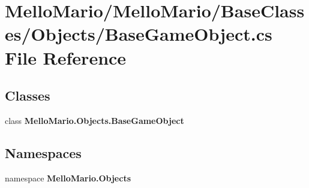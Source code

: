\section{Mello\+Mario/\+Mello\+Mario/\+Base\+Classes/\+Objects/\+Base\+Game\+Object.cs File Reference}
\label{BaseGameObject_8cs}
\subsection*{Classes}
\begin{DoxyCompactItemize}
\item 
class \textbf{ Mello\+Mario.\+Objects.\+Base\+Game\+Object}
\end{DoxyCompactItemize}
\subsection*{Namespaces}
\begin{DoxyCompactItemize}
\item 
namespace \textbf{ Mello\+Mario.\+Objects}
\end{DoxyCompactItemize}
